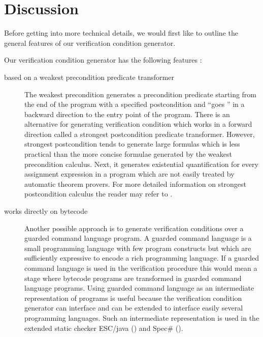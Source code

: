 \section{Discussion}\label{wp:discussionVC}


Before getting into more technical details, we would first like
to outline the general features of our verification condition
generator. 


Our verification condition generator has the following features :

\begin{description}
  \item [based on a weakest precondition predicate transformer] 
        The weakest precondition generates a precondition predicate starting 
	from the end of the program with a specified postcondition and ``goes '' in a backward
	direction to the entry point of the program. There is an alternative for generating
	verification condition  which works in a forward direction called a strongest postcondition
	predicate transformer. However, strongest postcondition tends to generate large formulas which is less practical than the more concise
	formulae generated by the  weakest precondition calculus.
	Next, it generates existential quantification for every assignment expression in a program which
	are not easily treated by automatic theorem provers.  
	For more detailed information on strongest postcondition calculus the reader may refer to  \cite{WPCDS}.
 
  \item [works directly on bytecode] 
        Another possible approach is to generate verification conditions over a guarded command language program.
	A guarded command language is a small programming language with few program constructs but which are 
	sufficiently expressive to encode a rich programming language. 
	If a guarded command language is used in the verification procedure this would mean 
	a stage where  bytecode programs are transformed in guarded command language programs.
	Using guarded command language as an intermediate representation of programs
	is useful because the verification condition generator can interface and can be extended to interface 
	easily several programming languages. 
	Such an intermediate representation is used in the extended static checker
	ESC/java (\cite{escjava}) and Spec\# (\cite{BLS04sp}). 
	

\end{description}
